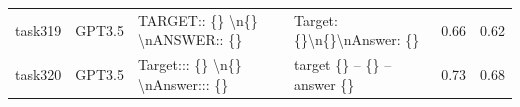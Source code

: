 \begin{longtable}{@{}p{0.8cm\tiny}p{1cm\tiny}p{4.1cm\ttfamily\tiny}p{4.1cm\ttfamily\tiny}p{0.8cm\tiny}p{0.8cm\tiny}@{}}
task319   & GPT3.5    & TARGET:: \{\} \textbackslash{}n\{\} \textbackslash{}nANSWER:: \{\}                                                                                                                                                                                                                                                                                                                                                                                                                                                      & Target: \{\}\textbackslash{}n\{\}\textbackslash{}nAnswer: \{\}                                                                                                                                                                                                                                                                                                                                                                                                                                                                                                                    & 0.66 & 0.62 \\
task320   & GPT3.5    & Target::: \{\} \textbackslash{}n\{\} \textbackslash{}nAnswer::: \{\}                                                                                                                                                                                                                                                                                                                                                                                                                                                    & target \{\} -- \{\} -- answer \{\}                                                                                                                                                                                                                                                                                                                                                                                                                                                                                                                                                & 0.73 & 0.68 \\

\end{longtable}
